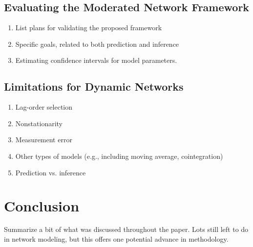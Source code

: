 \subsection{Evaluating the Moderated Network Framework}
\begin{enumerate}
    \item List plans for validating the proposed framework
    \item Specific goals, related to both prediction and inference
    \item Estimating confidence intervals for model parameters.
\end{enumerate}
\subsection{Limitations for Dynamic Networks}
\begin{enumerate}
    \item Lag-order selection
    \item Nonstationarity
    \item Measurement error
    \item Other types of models (e.g., including moving average, cointegration)
    \item Prediction vs. inference
\end{enumerate}

\section{Conclusion}
Summarize a bit of what was discussed throughout the paper. Lots still left to do in network modeling, but this offers one potential advance in methodology.